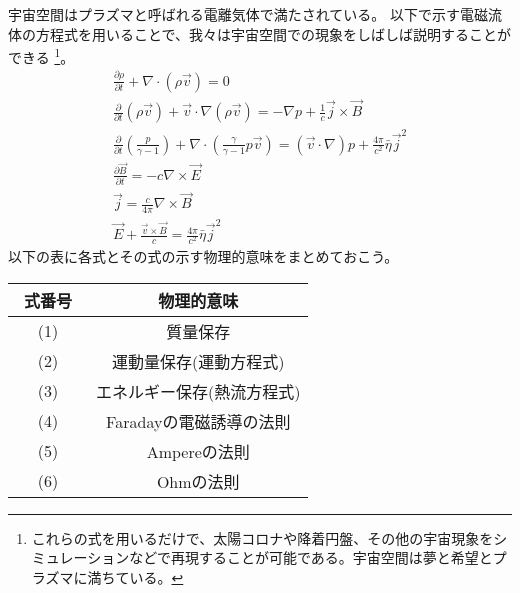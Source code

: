 \documentclass{jsarticle}
\def \pa{\partial}
\begin{document}
\begin{center}
\end{center}
\vspace*{1cm}

宇宙空間はプラズマと呼ばれる電離気体で満たされている。
以下で示す電磁流体の方程式を用いることで、我々は宇宙空間での現象をしばしば説明することができる
\footnote{これらの式を用いるだけで、太陽コロナや降着円盤、その他の宇宙現象をシミュレーションなどで再現することが可能である。宇宙空間は夢と希望とプラズマに満ちている。}。
\begin{gather}
  \frac{\pa \rho}{\pa t} + \nabla \cdot (\rho \vec{v})=0\\
  \frac{\pa}{\pa t}(\rho \vec{v})+\vec{v}\cdot\nabla(\rho \vec{v})=-\nabla p + \frac{1}{c}\vec{j} \times \vec{B}\\
  \frac{\pa}{\pa t}\left( \frac{p}{\gamma - 1} \right) + \nabla \cdot \left( \frac{\gamma}{\gamma -1}p\vec{v} \right) = (\vec{v}\cdot \nabla)p + \frac{4\pi}{c^2}\bar{\eta}\vec{j}^2\\
  \frac{\pa \vec{B}}{\pa t} = -c\nabla \times \vec{E}\\
  \vec{j} = \frac{c}{4\pi}\nabla \times \vec{B}\\
  \vec{E}+\frac{\vec{v}\times \vec{B}}{c}=\frac{4\pi}{c^2}\bar{\eta}\vec{j}^2
\end{gather}
以下の表に各式とその式の示す物理的意味をまとめておこう。
\begin{center}
\begin{tabular}{|c|c|}
  \hline
  式番号　& 物理的意味\\
  \hline
  (1) & 質量保存\\
  \hline
  (2) & 運動量保存(運動方程式)\\
  \hline
  (3) & エネルギー保存(熱流方程式)\\
  \hline
  (4) & Faradayの電磁誘導の法則\\
  \hline
  (5) & Ampereの法則\\
  \hline
  (6) & Ohmの法則\\
  \hline
\end{tabular}

\vspace*{2.5cm}

\end{center}
\end{document}

